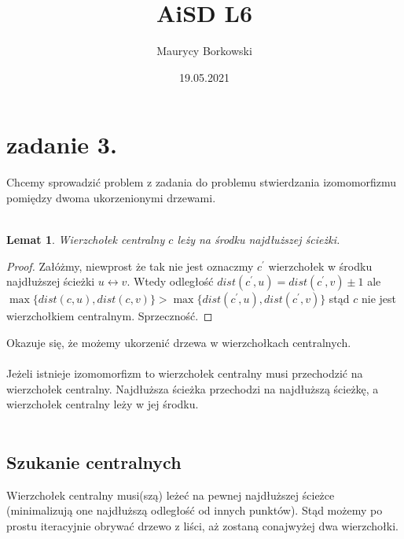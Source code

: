 \documentclass{article}
\title{AiSD L6}
\date{19.05.2021}
\author{Maurycy Borkowski}
\newtheorem{lemma}{Lemat}
\begin{document}
\maketitle
\section{zadanie 3.}
Chcemy sprowadzić problem z zadania do problemu stwierdzania izomomorfizmu pomiędzy dwoma ukorzenionymi drzewami.\\\\
\begin{lemma}Wierzchołek centralny $c$ leży na środku najdłuższej ścieżki.\end{lemma}
\begin{proof}
Załóżmy, niewprost że tak nie jest oznaczmy $c^\prime$ wierzchołek w środku najdłuższej ścieżki $u \leftrightarrow v$. Wtedy odległość $dist(c^\prime,u) = dist(c^\prime,v) \pm 1$ ale $\max \{dist(c,u), dist(c,v)\} > \max \{dist(c^\prime,u), dist(c^\prime,v)\}$ stąd $c$ nie jest wierzchołkiem centralnym. Sprzeczność.
\end{proof}
Okazuje się, że możemy ukorzenić drzewa w wierzchołkach centralnych.\\\\
Jeżeli istnieje izomomorfizm to wierzchołek centralny musi przechodzić na wierzchołek centralny. Najdłuższa ścieżka przechodzi na najdłuższą ścieżkę, a wierzchołek centralny leży w jej środku.\\\\
\subsection*{Szukanie centralnych}
Wierzchołek centralny musi(szą) leżeć na pewnej najdłuższej ścieżce (minimalizują one najdłuższą odległość od innych punktów). Stąd możemy po prostu iteracyjnie obrywać drzewo z liści, aż zostaną conajwyżej dwa wierzchołki.
\clearpage
\end{document}
